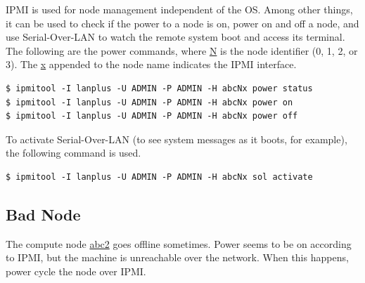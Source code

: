 \documentclass{article}
\begin{document}
IPMI is used for node management independent of the OS. Among other things, it
can be used to check if the power to a node is on, power on and off a node, and
use Serial-Over-LAN to watch the remote system boot and access its terminal.
The following are the power commands, where \url{N} is the node identifier (0,
1, 2, or 3). The \url{x} appended to the node name indicates the IPMI
interface.

\small {
\begin{verbatim}
$ ipmitool -I lanplus -U ADMIN -P ADMIN -H abcNx power status
$ ipmitool -I lanplus -U ADMIN -P ADMIN -H abcNx power on
$ ipmitool -I lanplus -U ADMIN -P ADMIN -H abcNx power off
\end{verbatim}
}

To activate Serial-Over-LAN (to see system messages as it boots, for example),
the following command is used.

\small {
\begin{verbatim}
$ ipmitool -I lanplus -U ADMIN -P ADMIN -H abcNx sol activate
\end{verbatim}
}


\subsection{Bad Node}

The compute node \url{abc2} goes offline sometimes. Power seems to be on
according to IPMI, but the machine is unreachable over the network. When this
happens, power cycle the node over IPMI.
\end{document}
